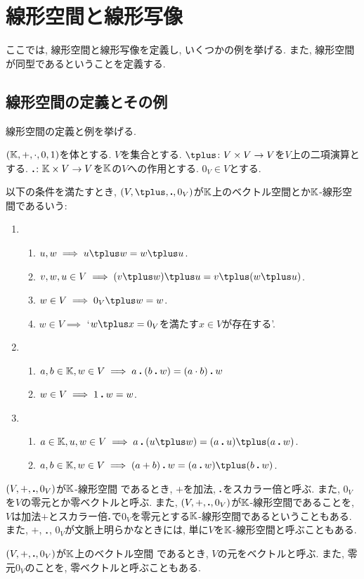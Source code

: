 \chapter{線形空間と線形写像}
ここでは, 線形空間と線形写像を定義し,
いくつかの例を挙げる.
また, 線形空間が同型であるということを定義する.

\section{線形空間の定義とその例}
線形空間の定義と例を挙げる.

\begin{definition}
  $(\mathbb{K},+,\cdot,0,1)$を体とする.
  $V$を集合とする.
  $\pplus\colon V\times V \to V$を$V$上の二項演算とする.
  $\mathbin{\boldsymbol{.}} \colon \mathbb{K}\times V \to V$を$\mathbb{K}$の$V$への作用とする.
  $0_V \in V$とする.

  以下の条件を満たすとき,
  $(V,\pplus,\act ,0_V)$が$\mathbb{K}$上のベクトル空間とか$\mathbb{K}$-線形空間であるいう:
  \begin{enumerate}
  \item 
    \begin{enumerate}
    \item $u,w\implies  u\pplus w=w\pplus u$.
    \item
      \label{def:vecsp:item:sum:ass}
      $v,w,u\in V \implies (v\pplus w)\pplus u=v\pplus (w\pplus u)$.
    \item $w\in V \implies 0_V\pplus w=w$.
    \item $w\in V\implies $ `$w\pplus x=0_V$を満たす$x\in V$が存在する'.
    \end{enumerate}
  \item
    \begin{enumerate}
    \item
      \label{def:vecsp:item:prod:ass}
      $a,b\in\mathbb{K}, w\in V \implies a\mathbin{\boldsymbol{.}} (b\mathbin{\boldsymbol{.}} w)=(a\cdot b)\mathbin{\boldsymbol{.}} w$
    \item $w\in V \implies 1\mathbin{\boldsymbol{.}} w=w$.
    \end{enumerate}
  \item
    \begin{enumerate}
    \item $a\in \KK,u,w\in V \implies a\act (u\pplus w)=(a\act u)\pplus (a\act w)$.
    \item $a,b\in\KK, w\in V\implies (a+b)\act w=(a\act w)\pplus (b\act w)$.
    \end{enumerate}
  \end{enumerate}
\end{definition}
\begin{remark}
  $(V,+,\mathbin{\boldsymbol{.}} ,0_V)$が$\mathbb{K}$-線形空間
  であるとき,
  $+$を加法, $\mathbin{\boldsymbol{.}} $をスカラー倍と呼ぶ.
  また, $0_V$を$V$の零元とか零ベクトルと呼ぶ.
  また, 
  $(V,+,\mathbin{\boldsymbol{.}} ,0_V)$が$\mathbb{K}$-線形空間であることを,
  $V$は加法$+$とスカラー倍$\mathbin{\boldsymbol{.}} $で$0_V$を零元とする$\mathbb{K}$-線形空間であるということもある.
  また, $+$, $\mathbin{\boldsymbol{.}} $, $0_V$が文脈上明らかなときには,
  単に$V$を$\mathbb{K}$-線形空間と呼ぶこともある.
\end{remark}
\begin{remark}
  $(V,+,\mathbin{\boldsymbol{.}} ,0_V)$が$\mathbb{K}$上のベクトル空間
  であるとき,
  $V$の元をベクトルと呼ぶ.
  また, 零元$0_V$のことを, 零ベクトルと呼ぶこともある.
\end{remark}

